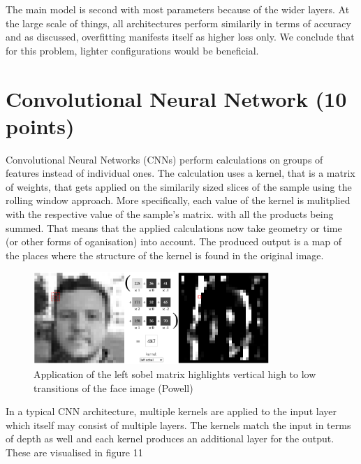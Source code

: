 \documentclass{article}
\begin{document}
The main model is second with most parameters because of the wider layers.
At the large scale of things, all architectures perform similarily in terms of accuracy and as discussed, overfitting manifests itself as higher loss only.
We conclude that for this problem, lighter configurations would be beneficial.

\section{Convolutional Neural Network (10 points)}

Convolutional Neural Networks (CNNs) perform calculations on groups of features instead of individual ones.
The calculation uses a kernel, that is a matrix of weights, that gets applied on the similarily sized slices of the sample using the rolling window approach.
More specifically, each value of the kernel is mulitplied with the respective value of the sample's matrix. with all the products being summed.
That means that the applied calculations now take geometry or time (or other forms of oganisation) into account.
The produced output is a map of the places where the structure of the kernel is found in the original image.

\begin{figure}[h!]
    \centering
    \includegraphics[width=0.8\textwidth]{./plots/screenshot6.png}  %
    \caption{Application of the left sobel matrix highlights vertical high to low transitions of the face image (Powell)}
    \label{fig:plot12}  %
\end{figure}

In a typical CNN architecture, multiple kernels are applied to the input layer which itself may consist of multiple layers.
The kernels match the input in terms of depth as well and each kernel produces an additional layer for the output. These are visualised in figure 11
\end{document}

